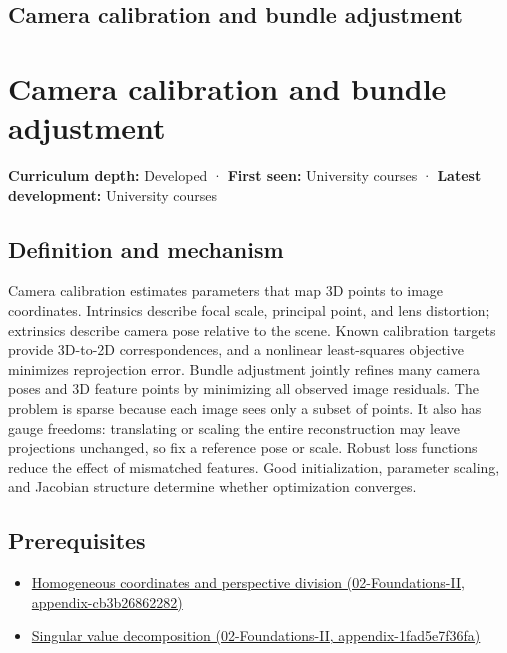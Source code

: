 \hypertarget{appendix-3ee9861904d5}{}
\section*{Camera calibration and bundle adjustment}
\chapter{Camera calibration and bundle adjustment}\label{appendix-3ee9861904d5-camera-calibration-and-bundle-adjustment}

\textbf{Curriculum depth:} Developed · \textbf{First seen:} University courses · \textbf{Latest development:} University courses

\section{Definition and mechanism}\label{appendix-3ee9861904d5-definition-and-mechanism}

Camera calibration estimates parameters that map 3D points to image coordinates. Intrinsics describe focal scale, principal point, and lens distortion; extrinsics describe camera pose relative to the scene. Known calibration targets provide 3D-to-2D correspondences, and a nonlinear least-squares objective minimizes reprojection error. Bundle adjustment jointly refines many camera poses and 3D feature points by minimizing all observed image residuals. The problem is sparse because each image sees only a subset of points. It also has gauge freedoms: translating or scaling the entire reconstruction may leave projections unchanged, so fix a reference pose or scale. Robust loss functions reduce the effect of mismatched features. Good initialization, parameter scaling, and Jacobian structure determine whether optimization converges.

\section{Prerequisites}\label{appendix-3ee9861904d5-prerequisites}

\begin{itemize}
\tightlist
\item
  \href{../02-Foundations-II/main.pdf\#nameddest=appendix-cb3b26862282}{Homogeneous coordinates and perspective division (02-Foundations-II, appendix-cb3b26862282)}
\item
  \href{../02-Foundations-II/main.pdf\#nameddest=appendix-1fad5e7f36fa}{Singular value decomposition (02-Foundations-II, appendix-1fad5e7f36fa)}
\end{itemize}

